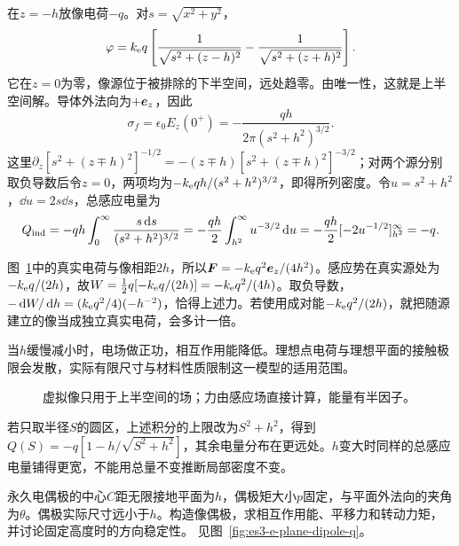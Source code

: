 \begin{solution}
在$z=-h$放像电荷$-q$。对$s=\sqrt{x^2+y^2}$，
\[\varphi=k_{\rm e} q\left[\frac1{\sqrt{s^2+(z-h)^2}}-\frac1{\sqrt{s^2+(z+h)^2}}\right].\]
它在$z=0$为零，像源位于被排除的下半空间，远处趋零。由唯一性，这就是上半空间解。导体外法向为$+\bm{e}_z$，因此
\[\sigma_f=\epsilon_0E_z(0^+)=-\frac{qh}{2\pi(s^2+h^2)^{3/2}}.
\]
这里$\partial_z[s^2+(z\mp h)^2]^{-1/2}=-(z\mp h)[s^2+(z\mp h)^2]^{-3/2}$；对两个源分别取负导数后令$z=0$，两项均为$-k_{\rm e} qh/(s^2+h^2)^{3/2}$，即得所列密度。令$u=s^2+h^2$，$\dd u=2s\dd s$，总感应电量为
\[Q_{\rm ind}=-qh\int_0^\infty\frac{s\mathop{}\!\mathrm d s}{(s^2+h^2)^{3/2}}
=-\frac{qh}{2}\int_{h^2}^\infty u^{-3/2}\mathop{}\!\mathrm d u
=-\frac{qh}{2}[-2u^{-1/2}]_{h^2}^\infty=-q.\]

图~\ref{fig:es3-e1-s}中的真实电荷与像相距$2h$，所以$\bm{F}=-k_{\rm e} q^2\bm{e}_z/(4h^2)$。感应势在真实源处为$-k_{\rm e} q/(2h)$，故$W=\tfrac12q[-k_{\rm e} q/(2h)]=-k_{\rm e} q^2/(4h)$。取负导数，$-\mathop{}\!\mathrm d W/\mathop{}\!\mathrm d h=(k_{\rm e} q^2/4)(-h^{-2})$，恰得上述力。若使用成对能$-k_{\rm e} q^2/(2h)$，就把随源建立的像当成独立真实电荷，会多计一倍。

当$h$缓慢减小时，电场做正功，相互作用能降低。理想点电荷与理想平面的接触极限会发散，实际有限尺寸与材料性质限制这一模型的适用范围。
\begin{figure}[H]\centering
{}
\caption{虚拟像只用于上半空间的场；力由感应场直接计算，能量有半因子。}\label{fig:es3-e1-s}
\end{figure}


若只取半径$S$的圆区，上述积分的上限改为$S^2+h^2$，得到$Q(S)=-q[1-h/\sqrt{S^2+h^2}]$，其余电量分布在更远处。$h$变大时同样的总感应电量铺得更宽，不能用总量不变推断局部密度不变。
\end{solution}


\begin{example}[接地平面附近的永久电偶极]\label{ex:es3-e-plane-dipole}
永久电偶极的中心$C$距无限接地平面为$h$，偶极矩大小$p$固定，与平面外法向的夹角为$\theta$。偶极实际尺寸远小于$h$。构造像偶极，求相互作用能、平移力和转动力矩，并讨论固定高度时的方向稳定性。 见图~\ref{fig:es3-e-plane-dipole-q}。
\end{example}

